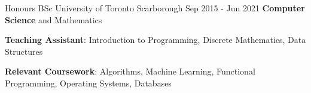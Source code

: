 
\begin{cventries}
  \cventry
    {Honours BSc}
    {University of Toronto}
    {Scarborough}
    {Sep 2015 - Jun 2021}
    {\textbf{Computer Science} and Mathematics}
    {
      \begin{cvitems}
        \item {\textbf{Teaching Assistant}: Introduction to Programming, Discrete Mathematics, Data Structures}
        \item {\textbf{Relevant Coursework}: Algorithms, Machine Learning, Functional Programming, Operating Systems, Databases}
      \end{cvitems}
    }
\end{cventries}
